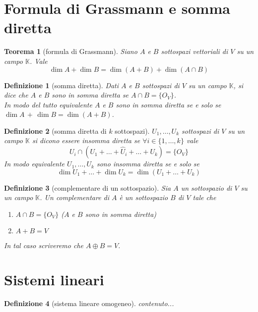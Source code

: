 \documentclass[9pt, a4paper]{article}
\newcommand{\K}{\mathbb{K}}
\theoremstyle{mythm}
\newtheorem{definition}{Definizione}[section]
\newtheorem{thm}{Teorema}[section]
\begin{document}
\clearpage

\section{Formula di Grassmann e somma diretta}

\begin{thm}[formula di Grassmann]
	Siano $ A $ e $ B $ sottospazi vettoriali di $ V $ su un campo $ \K $. Vale \[\dim A + \dim B = \dim (A + B) + \dim (A \cap B)\]
\end{thm}

\begin{definition}[somma diretta]
	Dati $ A $ e $ B $ sottospazi di $ V $ su un campo $ \K $, si dice che $ A $ e $ B $ sono in somma diretta se $ A \cap B = \{O_V\} $.\\
	In modo del tutto equivalente $ A $ e $ B $ sono in somma diretta se e solo se $ \dim A \, + \, \dim B = \dim (A + B) $.	
\end{definition}

\begin{definition}[somma diretta di $ k $ sottospazi]
	$ U_1, \ldots , U_k $ sottospazi di $ V $ su un campo $ \K $ si dicono essere insomma diretta se $ \forall i \in \{1, \ldots, k\} $ vale \[U_i \cap (U_1 + \ldots + \hat{U}_i + \ldots + U_k) = \{O_V\}\]
	In modo equivalente $ U_1, \ldots , U_k $ sono insomma diretta se e solo se \[\dim U_1 + \ldots + \dim U_k = \dim (U_1 + \ldots + U_k)\]
\end{definition}

\begin{definition}[complementare di un sottospazio]
	Sia $ A $ un sottospazio di $ V $ su un campo $ \K $. Un complementare di $ A $ è un sottospazio $ B $ di $ V $ tale che
	\begin{enumerate}[label=(\roman*)]
		\item $ A \cap B = \{O_V\} $ ($ A $ e $ B $ sono in somma diretta)
		\item $ A + B = V $
	\end{enumerate}
	In tal caso scriveremo che $ A \oplus B = V $. 
\end{definition}

\clearpage

\section{Sistemi lineari}

\begin{definition}[sistema lineare omogeneo]
	contenuto...
\end{definition}
\end{document}
